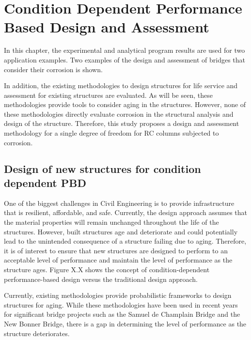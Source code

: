 \chapter{Condition Dependent Performance Based Design and Assessment}

\label{chap-six}

In this chapter, the experimental and analytical program results are used for two application examples. Two examples of the design and assessment of bridges that consider their corrosion is shown.

In addition, the existing methodologies to design structures for life service and assessment for existing structures are evaluated. As will be seen, these methodologies provide tools to consider aging in the structures. However, none of these methodologies directly evaluate corrosion in the structural analysis and design of the structure. Therefore, this study proposes a design and assessment methodology for a single degree of freedom for RC columns subjected to corrosion.

\section{Design of new structures for condition dependent PBD}

One of the biggest challenges in Civil Engineering is to provide infrastructure that is resilient, affordable, and safe. Currently, the design approach assumes that the material properties will remain unchanged throughout the life of the structures. However, built structures age and deteriorate and could potentially lead to the unintended consequence of a structure failing due to aging. Therefore, it is of interest to ensure that new structures are designed to perform to an acceptable level of performance and maintain the level of performance as the structure ages. Figure X.X shows the concept of condition-dependent performance-based design versus the traditional design approach. 

Currently, existing methodologies provide probabilistic frameworks to design structures for aging. While these methodologies have been used in recent years for significant bridge projects such as the Samuel de Champlain Bridge and the New Bonner Bridge, there is a gap in determining the level of performance as the structure deteriorates.

